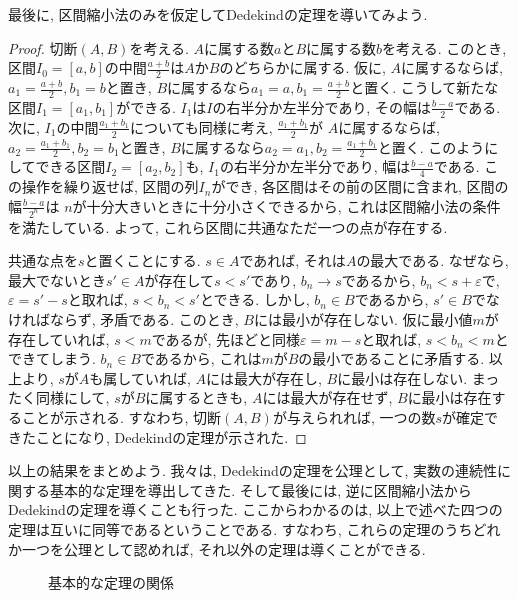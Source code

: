         最後に, 区間縮小法のみを仮定してDedekindの定理を導いてみよう.
        \begin{proof}
            切断$(A,B)$を考える. $A$に属する数$a$と$B$に属する数$b$を考える. このとき, 区間$I_0=[a,b]$の中間$\frac{a+b}{2}$は$A$か$B$のどちらかに属する.
            仮に, $A$に属するならば, $a_1=\frac{a+b}{2},b_1=b$と置き, $B$に属するなら$a_1=a,b_1=\frac{a+b}{2}$と置く. こうして新たな区間$I_1=[a_1,b_1]$ができる.
            $I_1$は$I$の右半分か左半分であり, その幅は$\frac{b-a}{2}$である. 次に, $I_1$の中間$\frac{a_1+b_1}{2}$についても同様に考え, $\frac{a_1+b_1}{2}$が
            $A$に属するならば, $a_2=\frac{a_1+b_1}{2},b_2=b_1$と置き, $B$に属するなら$a_2=a_1,b_2=\frac{a_1+b_1}{2}$と置く. このようにしてできる区間$I_2=[a_2,b_2]$も, 
            $I_1$の右半分か左半分であり, 幅は$\frac{b-a}{4}$である. この操作を繰り返せば, 区間の列$I_n$ができ, 各区間はその前の区間に含まれ, 区間の幅$\frac{b-a}{2^n}$は
            $n$が十分大きいときに十分小さくできるから, これは区間縮小法の条件を満たしている. よって, これら区間に共通なただ一つの点が存在する. 
            
            共通な点を$s$と置くことにする. $s\in A$であれば, それは$A$の最大である. なぜなら, 最大でないとき$s'\in A$が存在して$s<s'$であり, $b_n\rightarrow s$であるから, $b_n<s+\varepsilon$で, $\varepsilon=s'-s$と取れば, 
            $s<b_n<s'$とできる. しかし, $b_n\in B$であるから, $s'\in B$でなければならず, 矛盾である. このとき, $B$には最小が存在しない.
            仮に最小値$m$が存在していれば, $s<m$であるが, 先ほどと同様$\varepsilon=m-s$と取れば, $s<b_n<m$とできてしまう. $b_n\in B$であるから, これは$m$が$B$の最小であることに矛盾する.
            以上より, $s$が$A$も属していれば, $A$には最大が存在し, $B$に最小は存在しない. まったく同様にして, $s$が$B$に属するときも, $A$には最大が存在せず, $B$に最小は存在することが示される.
            すなわち, 切断$(A,B)$が与えられれば, 一つの数$s$が確定できたことになり, Dedekindの定理が示された. 
        \end{proof}
        \clearpage
        以上の結果をまとめよう. 我々は, Dedekindの定理を公理として, 実数の連続性に関する基本的な定理を導出してきた. そして最後には, 逆に区間縮小法からDedekindの定理を導くことも行った.
        ここからわかるのは, 以上で述べた四つの定理は互いに同等であるということである. すなわち, これらの定理のうちどれか一つを公理として認めれば, それ以外の定理は導くことができる.

        \begin{figure}[h]
            \centering
            \caption{基本的な定理の関係}
        \end{figure}


